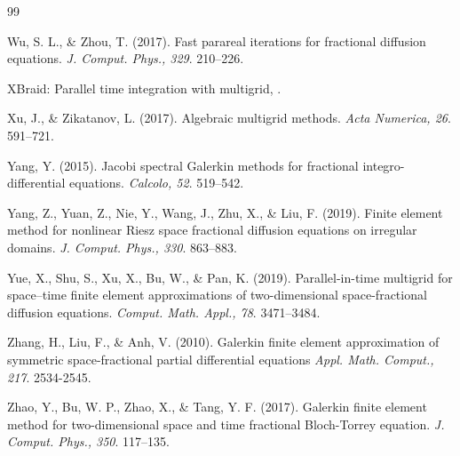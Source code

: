 \begin{thebibliography}{99}
\begin{LTRbibitems}
Wu, S. L., \& Zhou, T.
(2017).
Fast parareal iterations for fractional diffusion equations.
\textit{J. Comput. Phys., 329}.
210–226.

XBraid: Parallel time integration with multigrid, 
\href{https://llnl.gov/casc/xbraid}{}.

Xu, J., \& Zikatanov, L.
(2017).
Algebraic multigrid methods.
\textit{Acta Numerica, 26}.
591–721.

Yang, Y.
(2015).
Jacobi spectral Galerkin methods for fractional integro-differential equations.
\textit{Calcolo, 52}.
519–542.

Yang, Z., Yuan, Z., Nie, Y., Wang, J., Zhu, X., \& Liu, F.
(2019).
Finite element method for nonlinear Riesz space fractional diffusion equations on irregular domains.
\textit{J. Comput. Phys., 330}.
863–883.

Yue, X., Shu, S., Xu, X., Bu, W., \& Pan, K.
(2019).
Parallel-in-time multigrid for space–time finite element approximations of two-dimensional space-fractional diffusion equations.
\textit{Comput. Math. Appl., 78}.
3471–3484.

Zhang, H., Liu, F., \& Anh, V.
(2010).
Galerkin finite element approximation of symmetric space-fractional partial differential equations
\textit{Appl. Math. Comput., 217}.
2534-2545.

Zhao, Y., Bu, W. P., Zhao, X., \& Tang, Y. F.
(2017).
Galerkin finite element method for two-dimensional space and time fractional Bloch-Torrey equation.
\textit{J. Comput. Phys., 350}.
117–135.

\end{LTRbibitems}

\end{thebibliography}

